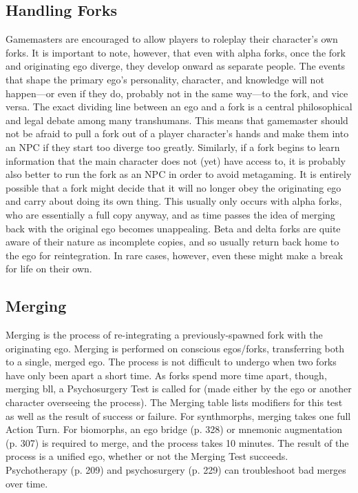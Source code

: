\subsection{Handling Forks}

Gamemasters are encouraged to allow players to roleplay
their character's own forks. It is important to
note, however, that even with alpha forks, once the 
fork and originating ego diverge, they develop onward 
as separate people. The events that shape the primary 
ego's personality, character, and knowledge will not 
happen—or even if they do, probably not in the same 
way—to the fork, and vice versa. The exact dividing 
line between an ego and a fork is a central philosophical
and legal debate among many transhumans.
This means that gamemaster should not be afraid 
to pull a fork out of a player character's hands and 
make them into an NPC if they start too diverge too 
greatly. Similarly, if a fork begins to learn information 
that the main character does not (yet) have access to, 
it is probably also better to run the fork as an NPC in 
order to avoid metagaming.
It is entirely possible that a fork might decide that 
it will no longer obey the originating ego and carry 
about doing its own thing. This usually only occurs 
with alpha forks, who are essentially a full copy 
anyway, and as time passes the idea of merging back 
with the original ego becomes unappealing. Beta and 
delta forks are quite aware of their nature as incomplete
copies, and so usually return back home to the
ego for reintegration. In rare cases, however, even 
these might make a break for life on their own.

\subsection{Merging}

Merging is the process of re-integrating a previously-spawned
fork with the originating ego. Merging is
performed on conscious egos/forks, transferring both 
to a single, merged ego. The process is not difficult 
to undergo when two forks have only been apart a 
short time. As forks spend more time apart, though, 
merging bll, a Psychosurgery 
Test is called for (made either by the ego or another 
character overseeing the process). The Merging table 
lists modifiers for this test as well as the result of success
or failure.
For synthmorphs, merging takes one full Action 
Turn. For biomorphs, an ego bridge (p. 328) or mnemonic
augmentation (p. 307) is required to merge,
and the process takes 10 minutes.
The result of the process is a unified ego, whether 
or not the Merging Test succeeds. Psychotherapy (p. 
209) and psychosurgery (p. 229) can troubleshoot bad 
merges over time. \\

